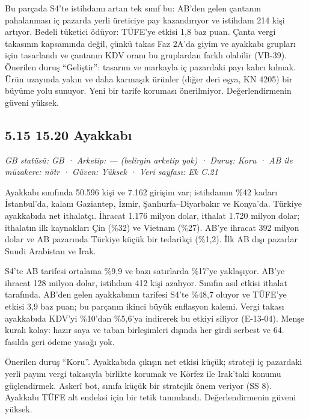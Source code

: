 Bu parçada S4'te istihdamı artan tek sınıf bu: AB'den gelen çantanın pahalanması iç pazarda yerli üreticiye pay kazandırıyor ve istihdam 214 kişi artıyor. Bedeli tüketici ödüyor: TÜFE'ye etkisi 1,8 baz puan. Çanta vergi takasının kapsamında değil, çünkü takas Faz 2A'da giyim ve ayakkabı grupları için tasarlandı ve çantanın KDV oranı bu gruplardan farklı olabilir \etiketD{} (VB-39). Önerilen duruş ``Geliştir'': tasarım ve markayla iç pazardaki payı kalıcı kılmak. Ürün uzayında yakın ve daha karmaşık ürünler (diğer deri eşya, KN 4205) bir büyüme yolu sunuyor. Yeni bir tarife koruması önerilmiyor. Değerlendirmenin güveni yüksek.

\hypertarget{nace_kartlar_13-15-515-1520-ayakkabux131}{%
\subsection{5.15 15.20 Ayakkabı}\label{nace_kartlar_13-15-515-1520-ayakkabux131}}

\emph{GB statüsü: GB · Arketip: --- (belirgin arketip yok) · Duruş: Koru · AB ile müzakere: nötr · Güven: Yüksek · Veri sayfası: Ek C.21}

Ayakkabı sınıfında 50.596 kişi ve 7.162 girişim var; istihdamın \%42 kadarı İstanbul'da, kalanı Gaziantep, İzmir, Şanlıurfa--Diyarbakır ve Konya'da. Türkiye ayakkabıda net ithalatçı. İhracat 1.176 milyon dolar, ithalat 1.720 milyon dolar; ithalatın ilk kaynakları Çin (\%32) ve Vietnam (\%27). AB'ye ihracat 392 milyon dolar ve AB pazarında Türkiye küçük bir tedarikçi (\%1,2). İlk AB dışı pazarlar Suudi Arabistan ve Irak.

S4'te AB tarifesi ortalama \%9,9 ve bazı satırlarda \%17'ye yaklaşıyor. AB'ye ihracat 128 milyon dolar, istihdam 412 kişi azalıyor. Sınıfın asıl etkisi ithalat tarafında. AB'den gelen ayakkabının tarifesi S4'te \%48,7 oluyor ve TÜFE'ye etkisi 3,9 baz puan; bu parçanın ikinci büyük enflasyon kalemi. Vergi takası ayakkabıda KDV'yi \%10'dan \%5,6'ya indirerek bu etkiyi siliyor (E-13-04). Menşe kuralı kolay: hazır saya ve taban birleşimleri dışında her girdi serbest ve 64. fasılda geri ödeme yasağı yok.

Önerilen duruş ``Koru''. Ayakkabıda çıkışın net etkisi küçük; strateji iç pazardaki yerli payını vergi takasıyla birlikte korumak ve Körfez ile Irak'taki konumu güçlendirmek. Askerî bot, sınıfa küçük bir stratejik önem veriyor (SS 8). Ayakkabı TÜFE alt endeksi için bir tetik tanımlandı. Değerlendirmenin güveni yüksek.


